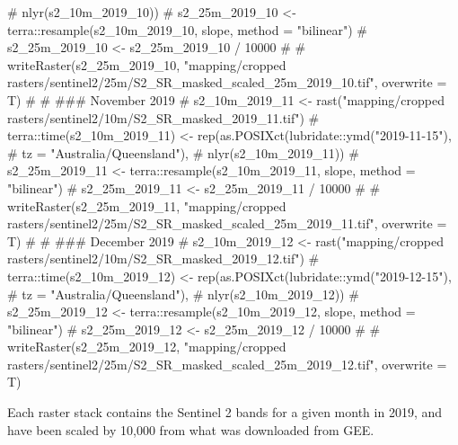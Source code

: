 \documentclass[
  letterpaper,
  DIV=11,
  numbers=noendperiod]{scrartcl}
\newenvironment{Shaded}{\begin{snugshade}}{\end{snugshade}}
\newcommand{\AlertTok}[1]{\textcolor[rgb]{0.68,0.00,0.00}{#1}}
\newcommand{\CommentTok}[1]{\textcolor[rgb]{0.37,0.37,0.37}{#1}}
\begin{document}
\begin{Shaded}
\begin{Highlighting}[]
\CommentTok{\#                                    nlyr(s2\_10m\_2019\_10))}
\CommentTok{\# s2\_25m\_2019\_10 \textless{}{-} terra::resample(s2\_10m\_2019\_10, slope, method = "bilinear")}
\CommentTok{\# s2\_25m\_2019\_10 \textless{}{-} s2\_25m\_2019\_10 / 10000}
\CommentTok{\# \# writeRaster(s2\_25m\_2019\_10, "mapping/cropped rasters/sentinel2/25m/S2\_SR\_masked\_scaled\_25m\_2019\_10.tif", overwrite = T)}
\CommentTok{\# }
\CommentTok{\# }\AlertTok{\#\#\#}\CommentTok{ November 2019}
\CommentTok{\# s2\_10m\_2019\_11 \textless{}{-} rast("mapping/cropped rasters/sentinel2/10m/S2\_SR\_masked\_2019\_11.tif")}
\CommentTok{\# terra::time(s2\_10m\_2019\_11) \textless{}{-} rep(as.POSIXct(lubridate::ymd("2019{-}11{-}15"), }
\CommentTok{\#                                               tz = "Australia/Queensland"), }
\CommentTok{\#                                    nlyr(s2\_10m\_2019\_11))}
\CommentTok{\# s2\_25m\_2019\_11 \textless{}{-} terra::resample(s2\_10m\_2019\_11, slope, method = "bilinear")}
\CommentTok{\# s2\_25m\_2019\_11 \textless{}{-} s2\_25m\_2019\_11 / 10000}
\CommentTok{\# \# writeRaster(s2\_25m\_2019\_11, "mapping/cropped rasters/sentinel2/25m/S2\_SR\_masked\_scaled\_25m\_2019\_11.tif", overwrite = T)}
\CommentTok{\# }
\CommentTok{\# }\AlertTok{\#\#\#}\CommentTok{ December 2019}
\CommentTok{\# s2\_10m\_2019\_12 \textless{}{-} rast("mapping/cropped rasters/sentinel2/10m/S2\_SR\_masked\_2019\_12.tif")}
\CommentTok{\# terra::time(s2\_10m\_2019\_12) \textless{}{-} rep(as.POSIXct(lubridate::ymd("2019{-}12{-}15"), }
\CommentTok{\#                                               tz = "Australia/Queensland"), }
\CommentTok{\#                                    nlyr(s2\_10m\_2019\_12))}
\CommentTok{\# s2\_25m\_2019\_12 \textless{}{-} terra::resample(s2\_10m\_2019\_12, slope, method = "bilinear")}
\CommentTok{\# s2\_25m\_2019\_12 \textless{}{-} s2\_25m\_2019\_12 / 10000}
\CommentTok{\# \# writeRaster(s2\_25m\_2019\_12, "mapping/cropped rasters/sentinel2/25m/S2\_SR\_masked\_scaled\_25m\_2019\_12.tif", overwrite = T)}
\end{Highlighting}
\end{Shaded}

Each raster stack contains the Sentinel 2 bands for a given month in
2019, and have been scaled by 10,000 from what was downloaded from GEE.
\end{document}
